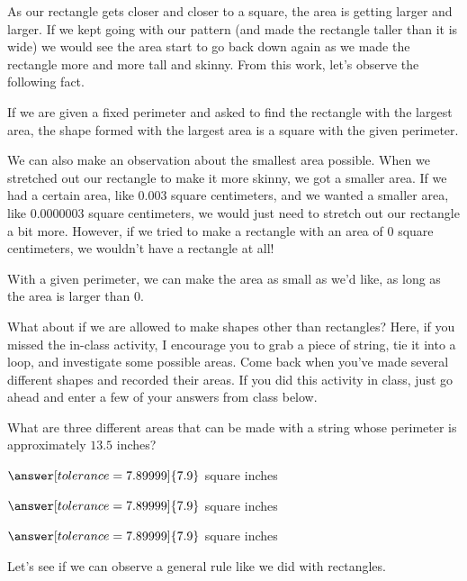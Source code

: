 \documentclass{ximera}
\begin{document}
As our rectangle gets closer and closer to a square, the area is getting larger and larger. If we kept going with our pattern (and made the rectangle taller than it is wide) we would see the area start to go back down again as we made the rectangle more and more tall and skinny. From this work, let's observe the following fact.
\begin{theorem}
If we are given a fixed perimeter and asked to find the rectangle with the largest area, the shape formed with the largest area is a square with the given perimeter.
\end{theorem}
We can also make an observation about the smallest area possible. When we stretched out our rectangle to make it more skinny, we got a smaller area. If we had a certain area, like $0.003$ square centimeters, and we wanted a smaller area, like $0.0000003$ square centimeters, we would just need to stretch out our rectangle a bit more. However, if we tried to make a rectangle with an area of $0$ square centimeters, we wouldn't have a rectangle at all!
\begin{theorem}
With a given perimeter, we can make the area as small as we'd like, as long as the area is larger than $0$.
\end{theorem}

What about if we are allowed to make shapes other than rectangles? Here, if you missed the in-class activity, I encourage you to grab a piece of string, tie it into a loop, and investigate some possible areas. Come back when you've made several different shapes and recorded their areas. If you did this activity in class, just go ahead and enter a few of your answers from class below.
\begin{question}
What are three different areas that can be made with a string whose perimeter is approximately $13.5$ inches?

\begin{prompt}
$\answer[tolerance=7.89999]{7.9}$ square inches

$\answer[tolerance=7.89999]{7.9}$ square inches

$\answer[tolerance=7.89999]{7.9}$ square inches
\end{prompt}
\end{question}

Let's see if we can observe a general rule like we did with rectangles.
\end{document}
